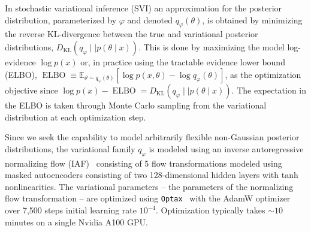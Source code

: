 \documentclass[prd,aps,10pt,nofootinbib,twocolumn,superscriptaddress,preprintnumbers,balancelastpage,longbibliography,floatfix]{revtex4-2}
\begin{document}
In stochastic variational inference (SVI) an approximation for the posterior distribution, parameterized by $\varphi$ and denoted $q_\varphi(\theta)$, is obtained by minimizing the reverse KL-divergence between the true and variational posterior distributions, $D_\mathrm{KL}\left(q_\varphi\mid\mid p(\theta\mid x)\right)$. This is done by maximizing the model log-evidence $\log p(x)$ or, in practice using the tractable evidence lower bound (ELBO), 
$\operatorname{ELBO} \equiv \mathbb E_{\vartheta\sim q_\varphi(\theta)}\left[\log p(x, \theta) - \log q_\varphi(\theta)\right]$,
as the optimization objective since $\log p(x) - \operatorname{ELBO} = D_\mathrm{KL}\left(q_\varphi\mid\mid p(\theta\mid x)\right)$. The expectation in the ELBO is taken through Monte Carlo sampling from the variational distribution at each optimization step.


Since we seek the capability to model arbitrarily flexible non-Gaussian posterior distributions, the variational family $q_\varphi$ is modeled using an inverse autoregressive normalizing flow (IAF)~\cite{10.5555/3157382.3157627} consisting of 5 flow transformations modeled using masked autoencoders consisting of two 128-dimensional hidden layers with tanh nonlinearities.
The variational parameters -- the parameters of the normalizing flow transformation -- are optimized using \texttt{Optax}~\citep{optax2020github} with the AdamW optimizer~\cite{kingma2014adam,loshchilov2017decoupled} over 7,500 steps
initial learning rate $10^{-4}$. Optimization typically takes $\sim 10$ minutes on a single Nvidia A100 GPU.
    
\end{document}
